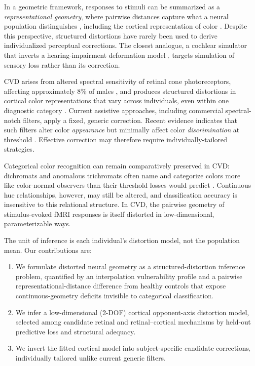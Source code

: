 \documentclass{article}
\begin{document}
In a geometric framework, responses to stimuli can be summarized as a \emph{representational geometry}, where pairwise distances capture what a neural population distinguishes \citep{kriegeskorte2008}, including the cortical representation of color \citep{brouwer2009, bannert2018}.
Despite this perspective, structured distortions have rarely been used to derive individualized perceptual corrections.
The closest analogue, a cochlear simulator that inverts a hearing-impairment deformation model \citep{irino2023}, targets simulation of sensory loss rather than its correction.

CVD arises from altered spectral sensitivity of retinal cone photoreceptors, affecting approximately 8\% of males \citep{machado2009}, and produces structured distortions in cortical color representations that vary across individuals, even within one diagnostic category \citep{tregillus2021}.
Current assistive approaches, including commercial spectral-notch filters, apply a fixed, generic correction.
Recent evidence indicates that such filters alter color \emph{appearance} but minimally affect color \emph{discrimination} at threshold \citep{somers2024}.
Effective correction may therefore require individually-tailored strategies.

Categorical color recognition can remain comparatively preserved in CVD: dichromats and anomalous trichromats often name and categorize colors more like color-normal observers than their threshold losses would predict \citep{bonnardel2006,emery2021cvd}.
Continuous hue relationships, however, may still be altered, and classification accuracy is insensitive to this relational structure.
In CVD, the pairwise geometry of stimulus-evoked fMRI responses is itself distorted in low-dimensional, parameterizable ways.

The unit of inference is each individual's distortion model, not the population mean.
Our contributions are:
\begin{enumerate}
    \item We formulate distorted neural geometry as a structured-distortion inference problem, quantified by an interpolation vulnerability profile and a pairwise representational-distance difference from healthy controls that expose continuous-geometry deficits invisible to categorical classification.
    \item We infer a low-dimensional (2-DOF) cortical opponent-axis distortion model, selected among candidate retinal and retinal--cortical mechanisms by held-out predictive loss and structural adequacy.
    \item We invert the fitted cortical model into subject-specific candidate corrections, individually tailored unlike current generic filters.
\end{enumerate}
\end{document}
